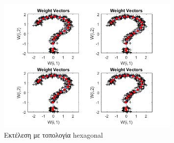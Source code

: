 \documentclass[12pt]{article}
\begin{document}
		\begin{figure}[H]
	 		\centering
			\includegraphics[width=0.8\textwidth]{fakelos/hexagonal_question.png}
			\caption{Εκτέλεση με τοπολογία hexagonal} 	  
			\label{fig:2}
		\end{figure}	
		
\end{document}
